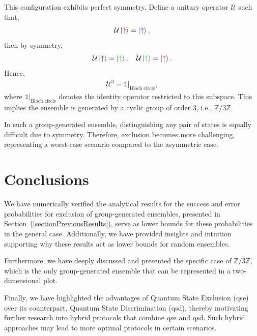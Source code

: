 \documentclass[12pt,letterpaper]{article}
\begin{document}
This configuration exhibits perfect symmetry. Define a unitary operator $\mathcal{U}$ such that,
\begin{align*}
\mathcal{U} \ket{\textcolor{red}{\uparrow}} = \ket{\textcolor{blue}{\uparrow}},
\end{align*}
then by symmetry,
\begin{align*}
\mathcal{U} \ket{\textcolor{blue}{\uparrow}} = \ket{\textcolor{green}{\uparrow}}, \quad \mathcal{U} \ket{\textcolor{green}{\uparrow}} = \ket{\textcolor{red}{\uparrow}}.
\end{align*}
Hence,
\begin{align*}
\mathcal{U}^3 = \mathds{1}|_{\text{Bloch circle}},
\end{align*}
where $\mathds{1}|_{\text{Bloch circle}}$ denotes the identity operator restricted to this subspace. This implies the ensemble is generated by a cyclic group of order 3, i.e., $\mathbb{Z}/3\mathbb{Z}$.

In such a group-generated ensemble, distinguishing any pair of states is equally difficult due to symmetry. Therefore, exclusion becomes more challenging, representing a worst-case scenario compared to the asymmetric case.

\newpage
\section{Conclusions}

We have numerically verified the analytical results for the success and error probabilities for exclusion of group-generated ensembles, presented in Section~(\ref{sectionPreviousResults}), serve as lower bounds for these probabilities in the general case. Additionally, we have provided insights and intuition supporting why these results act as lower bounds for random ensembles.

Furthermore, we have deeply discussed and presented the specific case of $\mathbb{Z}/3\mathbb{Z}$, which is the only group-generated ensemble that can be represented in a two-dimensional plot.

Finally, we have highlighted the advantages of Quantum State Exclusion (\gls{qse}) over its counterpart, Quantum State Discrimination (\gls{qsd}), thereby motivating further research into hybrid protocols that combine \gls{qse} and \gls{qsd}. Such hybrid approaches may lead to more optimal protocols in certain scenarios.

\newpage

 
\end{document}

